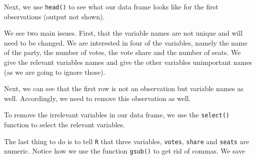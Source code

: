 \documentclass[12pt,oneside]{reedthesis}
\theoremstyle{definition}
\theoremstyle{definition}
\theoremstyle{definition}
\theoremstyle{remark}
\begin{document}
  Next, we use \texttt{head()} to see what our data frame looks like for
  the first observations (output not shown).
  \begin{Shaded}
  \begin{Highlighting}[]
  \end{Highlighting}
  \end{Shaded}
  We see two main issues. First, that the variable names are not unique
  and will need to be changed. We are interested in four of the variables,
  namely the name of the party, the number of votes, the vote share and
  the number of seats. We give the relevant variables names and give the
  other variables unimportant names (as we are going to ignore those).
  \begin{Shaded}
  \begin{Highlighting}[]
  \StringTok{ }\NormalTok{(}\NormalTok{, }\NormalTok{, }\NormalTok{, }\NormalTok{, }\NormalTok{, }
                       \NormalTok{, }\NormalTok{, }\NormalTok{, }\NormalTok{, }\NormalTok{)}
  \end{Highlighting}
  \end{Shaded}
  Next, we can see that the first row is not an observation but variable
  names as well. Accordingly, we need to remove this observation as well.
  \begin{Shaded}
  \begin{Highlighting}[]
  \StringTok{ }\NormalTok{ep14_raw[}\OperatorTok{-}\NormalTok{(}\NormalTok{), ]}
  \end{Highlighting}
  \end{Shaded}
  To remove the irrelevant variables in our data frame, we use the
  \texttt{select()} function to select the relevant variables.
  \begin{Shaded}
  \end{Shaded}
  The last thing to do is to tell \texttt{R} that three variables,
  \texttt{votes}, \texttt{share} and \texttt{seats} are numeric. Notice
  how we use the function \texttt{gsub()} to get rid of commas. We save
\end{document}
